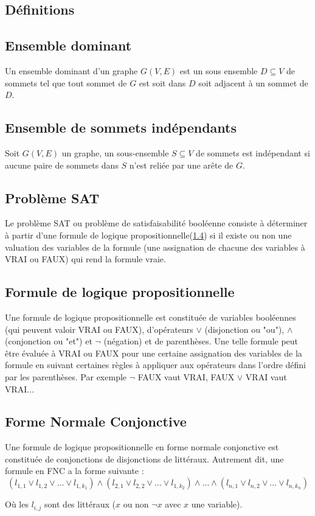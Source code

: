 \begin{appendix}
\section{Définitions}
\subsection{Ensemble dominant}
\label{def:ensemble_dominant}
Un ensemble dominant d'un graphe $G(V, E)$ est un sous ensemble $D \subseteq V$ de sommets tel que tout sommet de $G$ est soit dans $D$ soit adjacent à un sommet de $D$.

\subsection{Ensemble de sommets indépendants}
\label{def:ensemble_de_sommets_indépendant}
Soit $G(V, E)$ un graphe, un sous-ensemble $S \subseteq V$ de sommets est indépendant si aucune paire de sommets dans $S$ n'est reliée par une arête de $G$.

\subsection{Problème SAT}
\label{def:SAT}
Le problème SAT ou problème de satisfaisabilité booléenne consiste à déterminer à partir d'une formule de logique propositionnelle(\ref{def:formule_de_logique_propositionnelle}) si il existe ou non une valuation des variables de la formule (une assignation de chacune des variables à VRAI ou FAUX) qui rend la formule vraie.

\subsection{Formule de logique propositionnelle}
\label{def:formule_de_logique_propositionnelle}
Une formule de logique propositionnelle est constituée de variables booléennes (qui peuvent valoir VRAI ou FAUX), d'opérateurs $\vee$ (disjonction ou "ou"), $\wedge$ (conjonction ou "et") et $\neg$ (négation) et de parenthèses. Une telle formule peut être évaluée à VRAI ou FAUX pour une certaine assignation des variables de la formule en suivant certaines règles à appliquer aux opérateurs dans l'ordre défini par les parenthèses. Par exemple $\neg$ FAUX vaut VRAI, FAUX $\vee$ VRAI vaut VRAI...

\subsection{Forme Normale Conjonctive}
\label{def:forme_normale_conjonctive}
Une formule de logique propositionnelle en forme normale conjonctive est constituée de conjonctions de disjonctions de littéraux.
Autrement dit, une formule en FNC a la forme suivante :
$$(l_{1,1} \vee l_{1,2} \vee \ldots \vee l_{1,k_1}) \wedge (l_{2,1} \vee l_{2,2} \vee \ldots \vee l_{1,k_2}) \wedge \ldots \wedge (l_{n,1} \vee l_{n,2} \vee \ldots \vee l_{n,k_n})$$

Où les $l_{i, j}$ sont des littéraux ($x$ ou non $\neg x$ avec $x$ une variable).

\end{appendix}